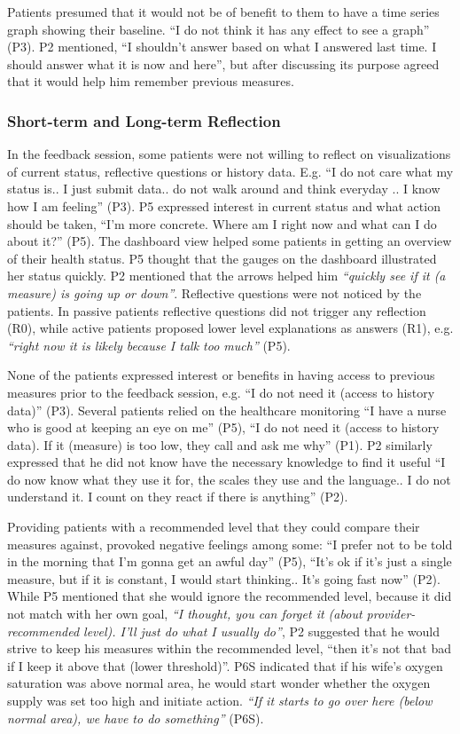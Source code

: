 Patients presumed that it would not be of benefit to them to have a time series graph showing their baseline. “I do not think it has any effect to see a graph” (P3). P2 mentioned, “I shouldn’t answer based on what I answered last time. I should answer what it is now and here”, but after discussing its purpose agreed that it would help him remember previous measures.

\subsubsection{Short-term and Long-term Reflection}
In the feedback session, some patients were not willing to reflect on visualizations of current status, reflective questions or history data. E.g. “I do not care what my status is.. I just submit data.. do not walk around and think everyday .. I know how I am feeling” (P3). P5 expressed interest in current status and what action should be taken, “I’m more concrete. Where am I right now and what can I do about it?” (P5). The dashboard view helped some patients in getting an overview of their health status. P5 thought that the gauges on the dashboard illustrated her status quickly. P2 mentioned that the arrows helped him \textit{“quickly see if it (a measure) is going up or down”}. Reflective questions were not noticed by the patients.  In passive patients reflective questions did not trigger any reflection (R0), while active patients proposed lower level explanations as answers (R1), e.g. \textit{“right now it is likely because I talk too much”} (P5).

None of the patients expressed interest or benefits in having access to previous measures prior to the feedback session, e.g. “I do not need it (access to history data)” (P3). Several patients relied on the healthcare monitoring “I have a nurse who is good at keeping an eye on me” (P5), “I do not need it (access to history data). If it (measure) is too low, they call and ask me why” (P1). P2 similarly expressed that he did not know have the necessary knowledge to find it useful “I do now know what they use it for, the scales they use and the language.. I do not understand it. I count on they react if there is anything” (P2).

Providing patients with a recommended level that they could compare their measures against, provoked negative feelings among some: “I prefer not to be told in the morning that I’m gonna get an awful day” (P5), “It’s ok if it’s just a single measure, but if it is constant, I would start thinking.. It’s going fast now” (P2). While P5 mentioned that she would ignore the recommended level, because it did not match with her own goal, \textit{“I thought, you can forget it (about provider-recommended level). I’ll just do what I usually do”}, P2 suggested that he would strive to keep his measures within the recommended level, “then it’s not that bad if I keep it above that (lower threshold)”. P6S indicated that if his wife’s oxygen saturation was above normal area, he would start wonder whether the oxygen supply was set too high and initiate action. \textit{“If it starts to go over here (below normal area), we have to do something”} (P6S).

